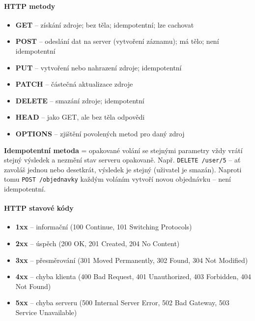 \paragraph{HTTP metody}
\begin{itemize}
  \item \textbf{GET} -- získání zdroje; bez těla; idempotentní; lze cachovat
  \item \textbf{POST} -- odeslání dat na server (vytvoření záznamu); má tělo; není idempotentní
  \item \textbf{PUT} -- vytvoření nebo nahrazení zdroje; idempotentní
  \item \textbf{PATCH} -- částečná aktualizace zdroje
  \item \textbf{DELETE} -- smazání zdroje; idempotentní
  \item \textbf{HEAD} -- jako GET, ale bez těla odpovědi
  \item \textbf{OPTIONS} -- zjištění povolených metod pro daný zdroj
\end{itemize}

\textbf{Idempotentní metoda} = opakované volání se stejnými parametry vždy vrátí stejný výsledek a nezmění stav serveru opakovaně. Např. \texttt{DELETE /user/5} -- ať zavoláš jednou nebo desetkrát, výsledek je stejný (uživatel je smazán). Naproti tomu \texttt{POST /objednavky} každým voláním vytvoří novou objednávku -- není idempotentní.

\paragraph{HTTP stavové kódy}
\begin{itemize}
  \item \textbf{1xx} -- informační (100 Continue, 101 Switching Protocols)
  \item \textbf{2xx} -- úspěch (200 OK, 201 Created, 204 No Content)
  \item \textbf{3xx} -- přesměrování (301 Moved Permanently, 302 Found, 304 Not Modified)
  \item \textbf{4xx} -- chyba klienta (400 Bad Request, 401 Unauthorized, 403 Forbidden, 404 Not Found)
  \item \textbf{5xx} -- chyba serveru (500 Internal Server Error, 502 Bad Gateway, 503 Service Unavailable)
\end{itemize}

